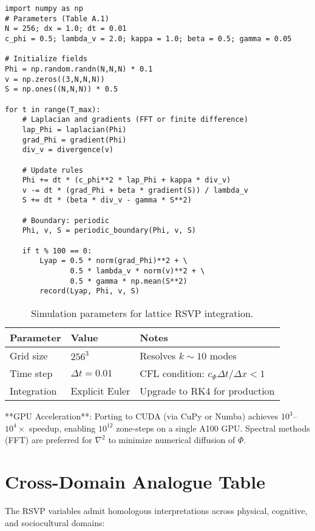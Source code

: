 \documentclass[12pt,a4paper]{article}
\begin{document}
\begin{enumerate}
\begin{verbatim}
import numpy as np
# Parameters (Table A.1)
N = 256; dx = 1.0; dt = 0.01
c_phi = 0.5; lambda_v = 2.0; kappa = 1.0; beta = 0.5; gamma = 0.05

# Initialize fields
Phi = np.random.randn(N,N,N) * 0.1
v = np.zeros((3,N,N,N))
S = np.ones((N,N,N)) * 0.5

for t in range(T_max):
    # Laplacian and gradients (FFT or finite difference)
    lap_Phi = laplacian(Phi)
    grad_Phi = gradient(Phi)
    div_v = divergence(v)
    
    # Update rules
    Phi += dt * (c_phi**2 * lap_Phi + kappa * div_v)
    v -= dt * (grad_Phi + beta * gradient(S)) / lambda_v
    S += dt * (beta * div_v - gamma * S**2)
    
    # Boundary: periodic
    Phi, v, S = periodic_boundary(Phi, v, S)
    
    if t % 100 == 0:
        Lyap = 0.5 * norm(grad_Phi)**2 + \
               0.5 * lambda_v * norm(v)**2 + \
               0.5 * gamma * np.mean(S**2)
        record(Lyap, Phi, v, S)
\end{verbatim}

\begin{table}[h]
\centering
\begin{tabular}{@{}lll@{}}
\toprule
\textbf{Parameter} & \textbf{Value} & \textbf{Notes} \\
\midrule
Grid size & $256^3$ & Resolves $k \sim 10$ modes \\
Time step & $\Delta t = 0.01$ & CFL condition: $c_\Phi \Delta t / \Delta x < 1$ \\
Integration & Explicit Euler & Upgrade to RK4 for production \\
\bottomrule
\end{tabular}
\caption{Simulation parameters for lattice RSVP integration.}
\end{table}

**GPU Acceleration**: Porting to CUDA (via CuPy or Numba) achieves $10^3$--$10^4\times$ speedup, enabling $10^{12}$ zone-steps on a single A100 GPU. Spectral methods (FFT) are preferred for $\nabla^2$ to minimize numerical diffusion of $\Phi$.

\section{Cross-Domain Analogue Table}

The RSVP variables admit homologous interpretations across physical, cognitive, and sociocultural domains:


\end{enumerate}
\end{document}
